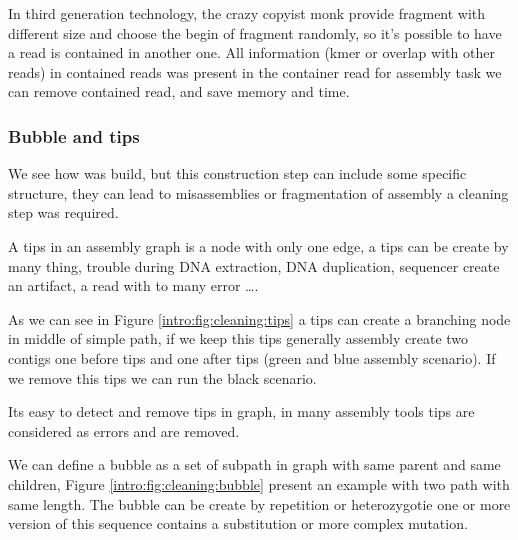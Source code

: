 \documentclass[main]{subfiles}
\begin{document}
In third generation technology, the crazy copyist monk provide fragment with different size and choose the begin of fragment randomly, so it's possible to have a read is contained in another one. All information (kmer or overlap with other reads) in contained reads was present in the container read for assembly task we can remove contained read, and save memory and time.

\subsubsection{Bubble and tips} \label{intro:subsubsec:bubble_tips}

We see how \OLC was build, but this construction step can include some specific structure, they can lead to misassemblies or fragmentation of assembly a cleaning step was required.

\begin{figure}[ht]
    \caption{}
    \label{intro:fig:cleaning}
\end{figure}

A tips in an assembly graph is a node with only one edge, a tips can be create by many thing, trouble during DNA extraction, DNA duplication, sequencer create an artifact, a read with to many error ….

As we can see in Figure \ref{intro:fig:cleaning:tips} a tips can create a branching node in middle of simple path, if we keep this tips generally assembly create two contigs one before tips and one after tips (green and blue assembly scenario). If we remove this tips we can run the black scenario.

Its easy to detect and remove tips in graph, in many assembly tools tips are considered as errors and are removed.

We can define a bubble as a set of subpath in graph with same parent and same children, Figure \ref{intro:fig:cleaning:bubble} present an example with two path with same length. The bubble can be create by repetition or heterozygotie one or more version of this sequence contains a substitution or more complex mutation.
\end{document}

